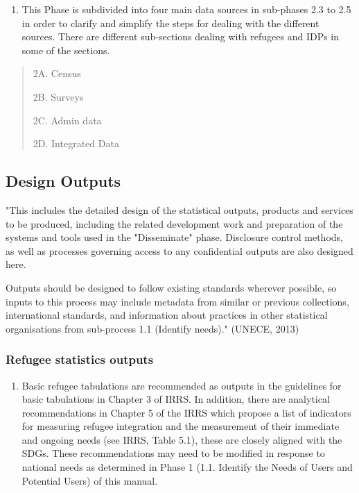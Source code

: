 \documentclass[
]{article}
\providecommand{\tightlist}{%
  \setlength{\itemsep}{0pt}\setlength{\parskip}{0pt}}
\begin{document}
\begin{enumerate}
\def\labelenumi{\arabic{enumi}.}
\setcounter{enumi}{59}
\tightlist
\item
  This Phase is subdivided into four main data sources in sub-phases
  2.3 to 2.5 in order to clarify and simplify the steps for dealing
  with the different sources. There are different sub-sections dealing
  with refugees and IDPs in some of the sections.
\end{enumerate}

\begin{quote}
2A. Census

2B. Surveys

2C. Admin data

2D. Integrated Data
\end{quote}

\hypertarget{design-outputs}{%
\subsection{Design Outputs}\label{design-outputs}}

"This includes the detailed design of the statistical outputs, products
and services to be produced, including the related development work and
preparation of the systems and tools used in the "Disseminate" phase.
Disclosure control methods, as well as processes governing access to any
confidential outputs are also designed here.

Outputs should be designed to follow existing standards wherever
possible, so inputs to this process may include metadata from similar or
previous collections, international standards, and information about
practices in other statistical organisations from sub-process 1.1
(Identify needs)." (UNECE, 2013)

\hypertarget{refugee-statistics-outputs}{%
\subsubsection{Refugee statistics outputs}\label{refugee-statistics-outputs}}

\begin{enumerate}
\def\labelenumi{\arabic{enumi}.}
\setcounter{enumi}{60}
\tightlist
\item
  Basic refugee tabulations are recommended as outputs in the
  guidelines for basic tabulations in Chapter 3 of IRRS. In addition,
  there are analytical recommendations in Chapter 5 of the IRRS which
  propose a list of indicators for measuring refugee integration and
  the measurement of their immediate and ongoing needs (see IRRS,
  Table 5.1), these are closely aligned with the SDGs. These
  recommendations may need to be modified in response to national
  needs as determined in Phase 1 (1.1. Identify the Needs of Users and
  Potential Users) of this manual.
\end{enumerate}
\end{document}
